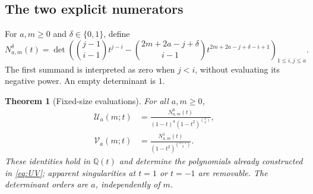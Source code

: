 \documentclass[11pt]{article}
\newtheorem{theorem}{Theorem}[section]
\theoremstyle{definition}
\theoremstyle{remark}
\newcommand{\Q}{\mathbb Q}
\newcommand{\U}{\mathcal U}
\newcommand{\V}{\mathcal V}
\numberwithin{equation}{section}
\begin{document}
\subsection{The two explicit numerators}
For $a,m\ge0$ and $\delta\in\{0,1\}$, define
\begin{equation}
 N^{\delta}_{a,m}(t)=
 \det\left(
 \binom{j-1}{i-1}t^{j-i}
 -\binom{2m+2a-j+\delta}{i-1}
 t^{2m+2a-j+\delta-i+1}
 \right)_{1\le i,j\le a}.
 \label{eq:N}
\end{equation}
The first summand is interpreted as zero when $j<i$, without evaluating
its negative power. An empty determinant is $1$.

\begin{theorem}[Fixed-size evaluations]
\label{thm:alternant}
For all $a,m\ge0$,
\begin{align}
 \U_a(m;t)&=
 \frac{N^0_{a,m}(t)}{(1-t)^a(1-t^2)^{\binom a2}},\label{eq:Uclosed}\\
 \V_a(m;t)&=
 \frac{N^1_{a,m}(t)}{(1-t^2)^{\binom{a+1}{2}}}.
 \label{eq:Vclosed}
\end{align}
These identities hold in $\Q(t)$ and determine the polynomials already
constructed in \eqref{eq:UV}; apparent singularities at $t=1$ or $t=-1$
are removable. The determinant orders are $a$, independently of $m$.
\end{theorem}
\end{document}
